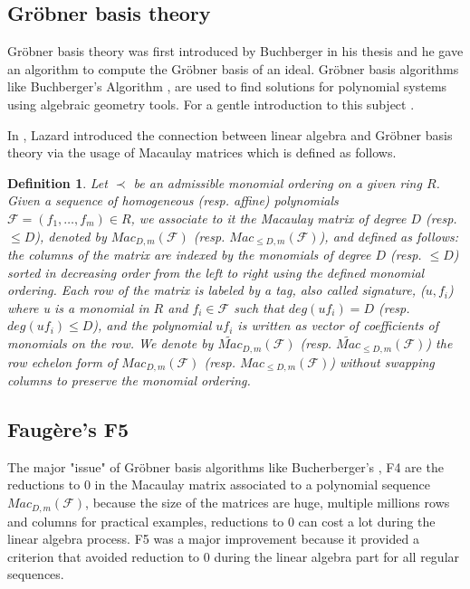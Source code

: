 \documentclass[english]{article}
\newtheorem{definition}{Definition}[section]
\newcommand{\Mac}[3]{{Mac_{#1, #2}(\mathcal{#3})}}
\newcommand{\Mact}[3]{{\widetilde{Mac}_{#1, #2}(\mathcal{#3})}}
\begin{document}
		\subsection{Gröbner basis theory}
		Gröbner basis theory was first introduced by Buchberger in his thesis \cite{Buc} and he gave an algorithm to compute the Gröbner basis of an ideal.
		Gröbner basis algorithms like Buchberger's Algorithm \cite{Buc}, are used to find solutions for polynomial systems using algebraic geometry tools. For a gentle introduction to this subject \cite{CLS}.
		
		In \cite{Lazard83}, Lazard introduced the connection between linear algebra and Gröbner basis theory via the usage of Macaulay matrices \cite{Mac} which is defined as follows.
		
		\begin{definition}
			Let $\prec$ be an admissible monomial ordering on a given ring $R$. Given a sequence of homogeneous (resp. affine) polynomials $\mathcal{F} = (f_1,\dots,f_m) \in R$, we associate to it the Macaulay matrix of degree $D$ (resp. $\leq D$), denoted by $\Mac{D}{m}{\mathcal{F}}$ (resp. $\Mac{\leq D}{m}{\mathcal{F}}$), and defined as follows: the columns of the matrix are indexed by the monomials of degree $D$ (resp. $\leq D$) sorted in decreasing order from the left to right using the defined monomial ordering. Each row of the matrix is labeled by a tag, also called signature, ($u, f_i$) where u is a monomial in $R$ and $f_i \in \mathcal{F}$ such that $deg(uf_i) = D$ (resp. $deg(uf_i) \leq D$), and the polynomial $uf_i$ is written as vector of coefficients of monomials on the row. We denote by $\Mact{D}{m}{F}$ (resp. $\Mact{\leq D}{m}{F}$) the row echelon form of $\Mac{D}{m}{\mathcal{F}}$ (resp. $\Mac{\leq D}{m}{\mathcal{F}}$) without swapping columns to preserve the monomial ordering.
		\end{definition}
		
		\subsection{Faugère's F5}
		
		The major "issue" of Gröbner basis algorithms like Bucherberger's \cite{Buc}, F4 \cite{F02} are the reductions to 0 in the Macaulay matrix associated to a polynomial sequence $\Mac{D}{m}{F}$, because the size of the matrices are huge, multiple millions rows and columns for practical examples,
		reductions to 0 can cost a lot during the linear algebra process. F5 \cite{F02} was a major improvement because it provided a criterion that avoided reduction to 0 during the linear algebra part for all regular sequences.
		
\end{document}
